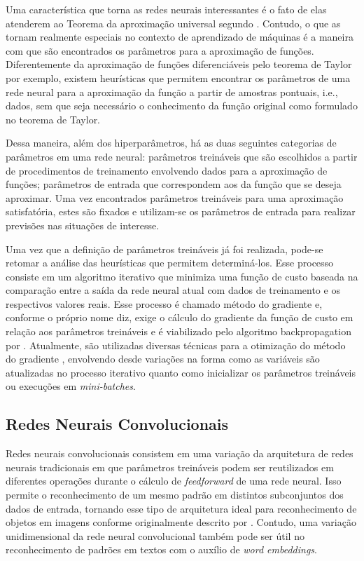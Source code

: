 Uma característica que torna as redes neurais interessantes é o fato de elas atenderem ao Teorema da aproximação universal segundo \cite{HORNIK1991251}. Contudo, o que as tornam realmente especiais no contexto de aprendizado de máquinas é a maneira com que são encontrados os parâmetros para a aproximação de funções. Diferentemente da aproximação de funções diferenciáveis pelo teorema de Taylor por exemplo, existem heurísticas que permitem encontrar os parâmetros de uma rede neural para a aproximação da função a partir de amostras pontuais, i.e., dados, sem que seja necessário o conhecimento da função original como formulado no teorema de Taylor.

Dessa maneira, além dos hiperparâmetros, há as duas seguintes categorias de parâmetros em uma rede neural: parâmetros treináveis que são escolhidos a partir de procedimentos de treinamento envolvendo dados para a aproximação de funções; parâmetros de entrada que correspondem aos da função que se deseja aproximar. Uma vez encontrados parâmetros treináveis para uma aproximação satisfatória, estes são fixados e utilizam-se os parâmetros de entrada para realizar previsões nas situações de interesse.

Uma vez que a definição de parâmetros treináveis já foi realizada, pode-se retomar a análise das heurísticas que permitem determiná-los. Esse processo consiste em um algoritmo iterativo que minimiza uma função de custo baseada na comparação entre a saída da rede neural atual com dados de treinamento e os respectivos valores reais. Esse processo é chamado método do gradiente e, conforme o próprio nome diz, exige o cálculo do gradiente da função de custo em relação aos parâmetros treináveis e é viabilizado pelo algoritmo backpropagation por \cite{Rumelhart1986}. Atualmente, são utilizadas diversas técnicas para a otimização do método do gradiente \cite{DBLP:journals/corr/Ruder16}, envolvendo desde variações na forma como as variáveis são atualizadas no processo iterativo quanto como inicializar os parâmetros treináveis ou execuções em \textit{mini-batches}.

\subsection{Redes Neurais Convolucionais}
Redes neurais convolucionais consistem em uma variação da arquitetura de redes neurais tradicionais em que parâmetros treináveis podem ser reutilizados em diferentes operações durante o cálculo de \textit{feedforward} de uma rede neural. Isso permite o reconhecimento de um mesmo padrão em distintos subconjuntos dos dados de entrada, tornando esse tipo de arquitetura ideal para reconhecimento de objetos em imagens conforme originalmente descrito por \cite{LeCun1999}. Contudo, uma variação unidimensional da rede neural convolucional também pode ser útil no reconhecimento de padrões em textos com o auxílio de \textit{word embeddings}.

